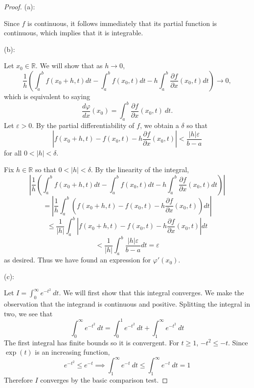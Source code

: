 \documentclass{article}
\theoremstyle{plain} %
\numberwithin{thm}{section} %
\theoremstyle{definition}
\begin{document}
        \begin{proof}
            (a):

            Since \(f\) is continuous, it follows immediately that its partial function is continuous, which implies that it is integrable.

            (b):

            Let \(x_0 \in \mathbb{R}\). We will show that as \(h\to 0\), \[\frac{1}{h} \left(\int _a^b f(x_0 + h,t)dt - \int _a^b f(x_0, t)dt - h\int _a^b \frac{\partial f}{\partial x} (x_0,t)dt\right) \to 0,\] which is equivalent to saying
            \[
                \dfrac{d\varphi}{dx}(x_0) = \int_a^b \dfrac{\partial f}{\partial x}(x_0,t) \ dt.
            \]
            Let \(\varepsilon > 0\). By the partial differentiability of \(f\), we obtain a \(\delta\) so that \[\left\vert f(x_0 + h, t) - f(x_0, t) - h\frac{\partial f}{\partial x}(x_0, t) \right\vert < \dfrac{|h|\varepsilon}{b-a}\] for all \(0 < |h| <\delta\).
            
            Fix \(h \in \mathbb{R}\) so that \(0 < |h| <\delta\). By the linearity of the integral,
            \[
                \left\vert \frac{1}{h} \left(\int _a^b f(x_0 + h,t)dt - \int _a^b f(x_0, t)dt - h\int _a^b \frac{\partial f}{\partial x} (x_0,t)dt\right) \right\vert
            \]
            \[
                = \left\vert\frac{1}{h}\int _a^b (f(x_0 + h, t) - f(x_0, t) - h\frac{\partial f}{\partial x} (x_0,t))dt\right\vert 
            \]
            \[
                \leq \frac{1}{|h|} \int _a^b \left\vert f(x_0 + h, t) - f(x_0, t) - h\frac{\partial f}{\partial x} (x_0,t) \right\vert dt
            \]
            \[
                < \frac{1}{|h|}\int _a^b \frac{|h|\varepsilon}{b-a}dt =\varepsilon
            \]
            as desired. Thus we have found an expression for \(\varphi ' (x_0)\).

            (c):

            Let \(I = \int _0^{\infty} e^{-t^2}\ dt\). We will first show that this integral converges. We make the observation that the integrand is continuous and positive. Splitting the integral in two, we see that
            \[
                \int _0^{\infty} e^{-t^2}\ dt = \int _0^{1} e^{-t^2}\ dt + \int _1^{\infty} e^{-t^2}\ dt
            \]
            The first integral has finite bounds so it is convergent. For \(t \geq 1\), \(-t^2 \leq -t\). Since \(\exp (t)\) is an increasing function,
            \[
                e^{-t^2} \leq e^{-t} \implies \int _1^{\infty} e^{-t}\ dt \leq \int _1^{\infty} e^{-t}\ dt = 1
            \]
            Therefore \(I\) converges by the basic comparison test.
            

\end{proof}
\end{document}
